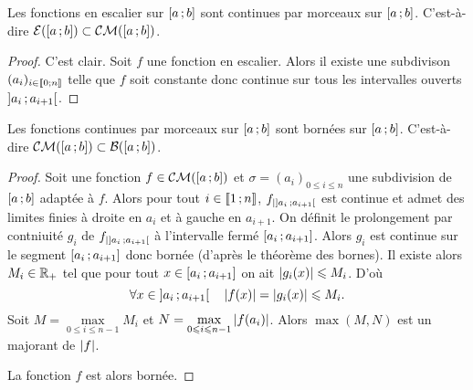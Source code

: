 \begin{prop}
  Les fonctions en escalier sur \(\left[ a \, ;  b \right]\) sont continues par morceaux sur \(\left[ a \, ;  b \right]\). C'est-à-dire \(\mathcal{E}(\left[ a \, ;  b \right]) \subset \mathcal{CM}(\left[ a \, ;  b \right])\).
\end{prop}
\begin{proof}
  C'est clair. Soit \(f\) une fonction en escalier. Alors il existe une subdivison \((a_i)_{i \in \mathopen{\llbracket}0\mathclose{}\mathpunct{};n\mathclose{\rrbracket}}\) telle que \(f\) soit constante donc continue sur tous les intervalles ouverts \(\left] a_i \, ;  a_{i+1} \right[\).
\end{proof}

\begin{prop}
  Les fonctions continues par morceaux sur \(\left[ a \, ;  b \right]\) sont bornées sur \(\left[ a \, ;  b \right]\). C'est-à-dire \(\mathcal{CM}(\left[ a \, ;  b \right]) \subset \mathcal{B}(\left[ a \, ;  b \right])\).
\end{prop}
\begin{proof}
  Soit une fonction \(f \in \mathcal{CM}(\left[ a \, ;  b \right])\) et \(\sigma=(a_i)_{0 \leqslant i \leqslant n}\) une subdivision de \(\left[ a \, ;  b \right]\) adaptée à \(f\). Alors pour tout \(i \in \mathopen{\llbracket}1\mathclose{}\mathpunct{};n\mathclose{\rrbracket}\), \(f_{|\left] a_i \, ;  a_{i+1} \right[}\) est continue et admet des limites finies à droite en \(a_{i}\) et à gauche en \(a_{i+1}\). On définit le prolongement par contniuité \(g_i\) de \(f_{|\left] a_i \, ;  a_{i+1} \right[}\) à l'intervalle fermé \(\left[ a_i \, ;  a_{i+1} \right]\). Alors \(g_i\) est continue sur le segment \(\left[ a_i \, ;  a_{i+1} \right]\) donc bornée (d'après le théorème des bornes). Il existe alors \(M_i \in \mathbb{R}_+\) tel que pour tout \(x \in \left[ a_i \, ;  a_{i+1} \right] \) on ait \(\left\lvert g_i(x)\right\rvert \leqslant M_i\). D'où
  \begin{equation}
    \forall x \in \left] a_i \, ;  a_{i+1} \right[ \quad \left\lvert f(x)\right\rvert=\left\lvert g_i(x)\right\rvert \leqslant M_i.
  \end{equation}
  Soit \(M=\max\limits_{0 \leqslant i \leqslant n-1} M_i\) et \(N=\max\limits_{0 \leqslant i \leqslant n-1} \left\lvert f(a_i)\right\rvert\). Alors \(\max(M,N)\) est un majorant de \(\left\lvert f\right\rvert\).

  La fonction \(f\) est alors bornée.
\end{proof}

